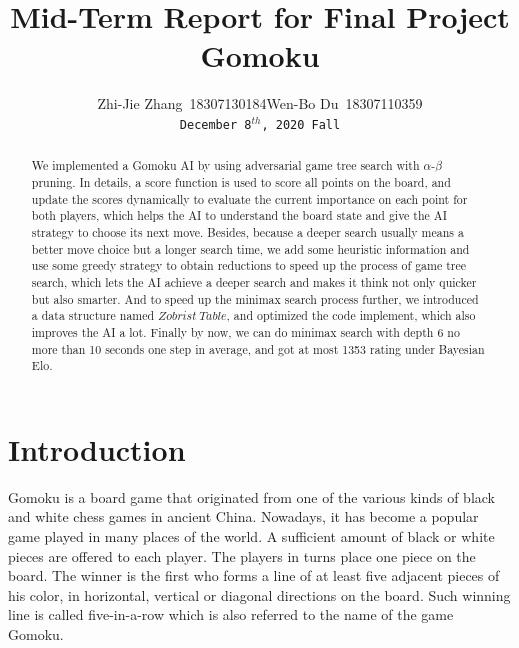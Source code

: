 \documentclass[final]{cvpr}
\begin{document}

\title{Mid-Term Report for Final Project Gomoku}
\author{Zhi-Jie Zhang\ 18307130184\quad \quad  Wen-Bo Du\ 18307110359 \\
    {\tt \small December 8$^{th}$, 2020 Fall}
}

\maketitle

\begin{abstract}
%
We implemented a Gomoku AI by using adversarial game tree search with $\alpha$-$\beta$ pruning. 
%
In details, a score function is used to score all points on the board, and update the scores dynamically to evaluate the current importance on each point for both players, which helps the AI to understand the board state and give the AI strategy to choose its next move.
%
Besides, because a deeper search usually means a better move choice but a longer search time, we add some heuristic information and use some greedy strategy to obtain reductions to speed up the process of game tree search, which lets the AI achieve a deeper search and makes it think not only quicker but also smarter.
%
And to speed up the minimax search process further, we introduced a data structure named $Zobrist\ Table$, and optimized the code implement, which also improves the AI a lot.
%
Finally by now, we can do minimax search with depth 6 no more than 10 seconds one step in average, and got at most 1353 rating under Bayesian Elo.
\end{abstract}




\section{Introduction}\label{sec:Introduction}

Gomoku is a board game that originated from one of the
various kinds of black and white chess games in ancient China.
%
Nowadays, it has become a popular game played in many places
of the world. A sufficient amount of black or white pieces are
offered to each player. 
%
The players in turns place one piece on the
board. 
%
The winner is the first who forms a line of at least five
adjacent pieces of his color, in horizontal, vertical or diagonal
directions on the board. 
%
Such winning line is called five-in-a-row
which is also referred to the name of the game Gomoku.  
\end{document}
